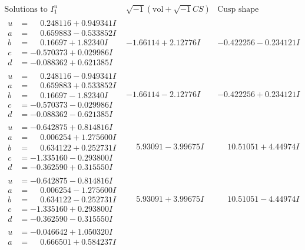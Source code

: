 \documentclass[1p]{elsarticle_modified}
\theoremstyle{definition}
\newcommand{\I}{\sqrt{-1}}
\begin{document}
$$\begin{array}{c|c|c}  
\text{Solutions to }I^u_{1}& \I (\text{vol} + \sqrt{-1}CS) & \text{Cusp shape}\\
 \hline 
\begin{aligned}
u &= \phantom{-}0.248116 + 0.949341 I \\
a &= \phantom{-}0.659883 - 0.533852 I \\
b &= \phantom{-}0.16697 + 1.82340 I \\
c &= -0.570373 + 0.029986 I \\
d &= -0.088362 + 0.621385 I\end{aligned}
 & -1.66114 + 2.12776 I & -0.422256 - 0.234121 I \\ \hline\begin{aligned}
u &= \phantom{-}0.248116 - 0.949341 I \\
a &= \phantom{-}0.659883 + 0.533852 I \\
b &= \phantom{-}0.16697 - 1.82340 I \\
c &= -0.570373 - 0.029986 I \\
d &= -0.088362 - 0.621385 I\end{aligned}
 & -1.66114 - 2.12776 I & -0.422256 + 0.234121 I \\ \hline\begin{aligned}
u &= -0.642875 + 0.814816 I \\
a &= \phantom{-}0.006254 + 1.275600 I \\
b &= \phantom{-}0.634122 + 0.252731 I \\
c &= -1.335160 - 0.293800 I \\
d &= -0.362590 + 0.315550 I\end{aligned}
 & \phantom{-}5.93091 - 3.99675 I & \phantom{-}10.51051 + 4.44974 I \\ \hline\begin{aligned}
u &= -0.642875 - 0.814816 I \\
a &= \phantom{-}0.006254 - 1.275600 I \\
b &= \phantom{-}0.634122 - 0.252731 I \\
c &= -1.335160 + 0.293800 I \\
d &= -0.362590 - 0.315550 I\end{aligned}
 & \phantom{-}5.93091 + 3.99675 I & \phantom{-}10.51051 - 4.44974 I \\ \hline\begin{aligned}
u &= -0.046642 + 1.050320 I \\
a &= \phantom{-}0.666501 + 0.584237 I \\

\end{aligned}
\end{array}$$
\end{document}
